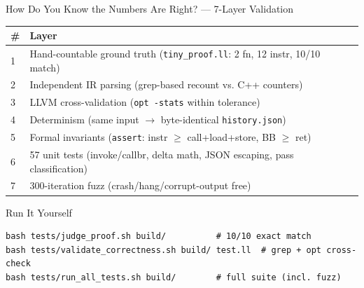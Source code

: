 \documentclass[aspectratio=169]{beamer}
\begin{document}
\begin{frame}{How Do You Know the Numbers Are Right? — 7-Layer Validation}
  \begin{tabular}{ll}
    \toprule
    \# & Layer \\
    \midrule
    1 & Hand-countable ground truth (\texttt{tiny\_proof.ll}: 2 fn, 12 instr, 10/10 match) \\
    2 & Independent IR parsing (grep-based recount vs. C++ counters) \\
    3 & LLVM cross-validation (\texttt{opt -stats} within tolerance) \\
    4 & Determinism (same input $\to$ byte-identical \texttt{history.json}) \\
    5 & Formal invariants (\texttt{assert}: instr $\ge$ call+load+store, BB $\ge$ ret) \\
    6 & 57 unit tests (invoke/callbr, delta math, JSON escaping, pass classification) \\
    7 & 300-iteration fuzz (crash/hang/corrupt-output free) \\
    \bottomrule
  \end{tabular}
  \vspace{0.5em}
  \begin{alertblock}{Run It Yourself}
    \begin{lstlisting}[style=bash]
bash tests/judge_proof.sh build/          # 10/10 exact match
bash tests/validate_correctness.sh build/ test.ll  # grep + opt cross-check
bash tests/run_all_tests.sh build/        # full suite (incl. fuzz)
    \end{lstlisting}
  \end{alertblock}
\end{frame}
\end{document}
